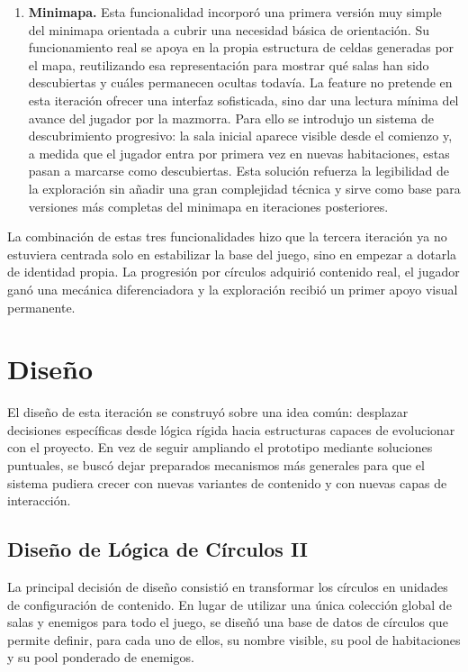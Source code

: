\begin{enumerate}
\item \textbf{Minimapa.} Esta funcionalidad incorporó una primera versión muy simple del
minimapa orientada a cubrir una necesidad básica de orientación. Su funcionamiento real se
apoya en la propia estructura de celdas generadas por el mapa, reutilizando esa
representación para mostrar qué salas han sido descubiertas y cuáles permanecen ocultas
todavía. La feature no pretende en esta iteración ofrecer una interfaz sofisticada, sino
dar una lectura mínima del avance del jugador por la mazmorra. Para ello se introdujo un
sistema de descubrimiento progresivo: la sala inicial aparece visible desde el comienzo y,
a medida que el jugador entra por primera vez en nuevas habitaciones, estas pasan a marcarse
como descubiertas. Esta solución refuerza la legibilidad de la exploración sin añadir una
gran complejidad técnica y sirve como base para versiones más completas del minimapa en
iteraciones posteriores.

\end{enumerate}

La combinación de estas tres funcionalidades hizo que la tercera iteración ya no estuviera
centrada solo en estabilizar la base del juego, sino en empezar a dotarla de identidad
propia. La progresión por círculos adquirió contenido real, el jugador ganó una mecánica
diferenciadora y la exploración recibió un primer apoyo visual permanente.

\section{Diseño}
El diseño de esta iteración se construyó sobre una idea común: desplazar decisiones
específicas desde lógica rígida hacia estructuras capaces de evolucionar con el proyecto.
En vez de seguir ampliando el prototipo mediante soluciones puntuales, se buscó dejar
preparados mecanismos más generales para que el sistema pudiera crecer con nuevas variantes
de contenido y con nuevas capas de interacción.

\subsection{Diseño de Lógica de Círculos II}
La principal decisión de diseño consistió en transformar los círculos en unidades de
configuración de contenido. En lugar de utilizar una única colección global de salas y
enemigos para todo el juego, se diseñó una base de datos de círculos que permite definir,
para cada uno de ellos, su nombre visible, su pool de habitaciones y su pool ponderado de
enemigos.

